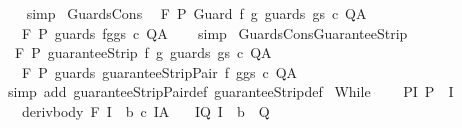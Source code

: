 \begin{isabellebody}
%
\isadelimproof
\ \ %
\endisadelimproof
%
\isatagproof
{}\isamarkupfalse%
\ simp%
\endisatagproof
{\isafoldproof}%
%
\isadelimproof
\isanewline
%
\endisadelimproof
\isanewline
{}\isamarkupfalse%
\ GuardsCons{\isacharcolon}\isanewline
\ \ {\isachardoublequoteopen}{\isasymGamma}{\isacharcomma}{\isasymTheta}{\isasymturnstile}\isactrlbsub {\isacharslash}F\isactrlesub \ P\ Guard\ f\ g\ {\isacharparenleft}guards\ gs\ c{\isacharparenright}\ Q{\isacharcomma}A\ {\isasymLongrightarrow}\ \isanewline
\ \ \ {\isasymGamma}{\isacharcomma}{\isasymTheta}{\isasymturnstile}\isactrlbsub {\isacharslash}F\isactrlesub \ P\ {\isacharparenleft}guards\ {\isacharparenleft}{\isacharparenleft}f{\isacharcomma}g{\isacharparenright}{\isacharhash}gs{\isacharparenright}\ c{\isacharparenright}\ Q{\isacharcomma}A{\isachardoublequoteclose}\isanewline
%
\isadelimproof
\ \ %
\endisadelimproof
%
\isatagproof
{}\isamarkupfalse%
\ simp%
\endisatagproof
{\isafoldproof}%
%
\isadelimproof
\isanewline
%
\endisadelimproof
\isanewline
{}\isamarkupfalse%
\ GuardsConsGuaranteeStrip{\isacharcolon}\isanewline
\ \ {\isachardoublequoteopen}{\isasymGamma}{\isacharcomma}{\isasymTheta}{\isasymturnstile}\isactrlbsub {\isacharslash}F\isactrlesub \ P\ guaranteeStrip\ f\ g\ {\isacharparenleft}guards\ gs\ c{\isacharparenright}\ Q{\isacharcomma}A\ {\isasymLongrightarrow}\ \isanewline
\ \ \ {\isasymGamma}{\isacharcomma}{\isasymTheta}{\isasymturnstile}\isactrlbsub {\isacharslash}F\isactrlesub \ P\ {\isacharparenleft}guards\ {\isacharparenleft}guaranteeStripPair\ f\ g{\isacharhash}gs{\isacharparenright}\ c{\isacharparenright}\ Q{\isacharcomma}A{\isachardoublequoteclose}\isanewline
%
\isadelimproof
\ \ %
\endisadelimproof
%
\isatagproof
{}\isamarkupfalse%
\ {\isacharparenleft}simp\ add{\isacharcolon}\ guaranteeStripPair{\isacharunderscore}def\ guaranteeStrip{\isacharunderscore}def{\isacharparenright}%
\endisatagproof
{\isafoldproof}%
%
\isadelimproof
\isanewline
%
\endisadelimproof
\isanewline
{}\isamarkupfalse%
\ While{\isacharcolon}\ \isanewline
\ \ \ P{\isacharunderscore}I{\isacharcolon}\ {\isachardoublequoteopen}P\ {\isasymsubseteq}\ I{\isachardoublequoteclose}\ \isanewline
\ \ \ deriv{\isacharunderscore}body{\isacharcolon}\ {\isachardoublequoteopen}{\isasymGamma}{\isacharcomma}{\isasymTheta}{\isasymturnstile}\isactrlbsub {\isacharslash}F\isactrlesub \ {\isacharparenleft}I\ {\isasyminter}\ b{\isacharparenright}\ c\ I{\isacharcomma}A{\isachardoublequoteclose}\isanewline
\ \ \ I{\isacharunderscore}Q{\isacharcolon}\ {\isachardoublequoteopen}I\ {\isasyminter}\ {\isacharminus}b\ {\isasymsubseteq}\ Q{\isachardoublequoteclose}\ \isanewline

\end{isabellebody}
